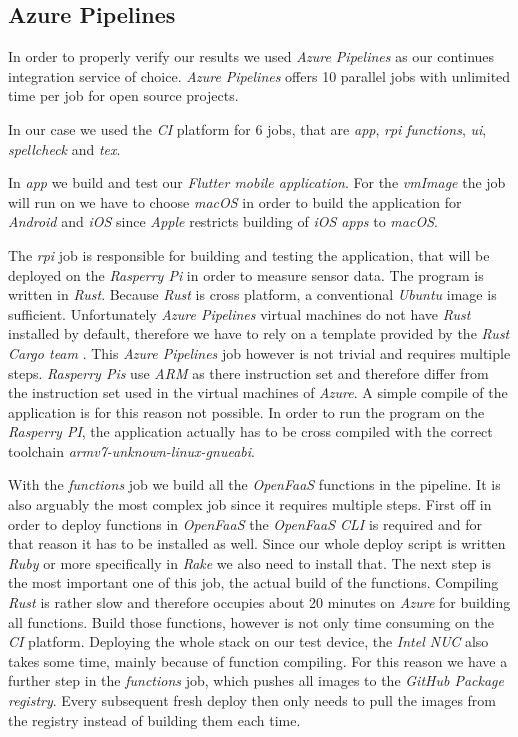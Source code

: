 \subsection{Azure Pipelines}

In order to properly verify our results we used \textit{Azure Pipelines} as our continues
integration service of choice. \textit{Azure Pipelines} offers 10 parallel jobs with unlimited time
per job for open source projects. \cite{azure-pipelines-devop}

In our case we used the \textit{CI} platform for 6 jobs, that are \textit{app}, \textit{rpi}
\textit{functions}, \textit{ui}, \textit{spellcheck} and \textit{tex}.

In \textit{app} we build and test our \textit{Flutter mobile application}. For the \textit{vmImage}
the job will run on we have to choose \textit{macOS} in order to build the application for
\textit{Android} and \textit{iOS} since \textit{Apple} restricts building of \textit{iOS apps} to
\textit{macOS}.

The \textit{rpi} job is responsible for building and testing the application, that will be deployed
on the \textit{Rasperry Pi} in order to measure sensor data. The program is written in
\textit{Rust}. Because \textit{Rust} is cross platform, a conventional \textit{Ubuntu} image is
sufficient. Unfortunately \textit{Azure Pipelines} virtual machines do not have \textit{Rust}
installed by default, therefore we have to rely on a template provided by the \textit{Rust Cargo
team} \cite{rust-cargo}. This \textit{Azure Pipelines} job however is not trivial and requires
multiple steps. \textit{Rasperry Pis} use \textit{ARM} as there instruction set and therefore differ
from the instruction set used in the virtual machines of \textit{Azure}. A simple compile of the
application is for this reason not possible. In order to run the program on the \textit{Rasperry
PI}, the application actually has to be cross compiled with the correct toolchain
\textit{armv7-unknown-linux-gnueabi}.

With the \textit{functions} job we build all the \textit{OpenFaaS} functions in the pipeline. It is
also arguably the most complex job since it requires multiple steps. First off in order to deploy
functions in \textit{OpenFaaS} the \textit{OpenFaaS CLI} is required and for that reason it has to
be installed as well. Since our whole deploy script is written \textit{Ruby} or more specifically in
\textit{Rake} we also need to install that. The next step is the most important one of this job, the
actual build of the functions. Compiling \textit{Rust} is rather slow and therefore occupies about
20 minutes on \textit{Azure} for building all functions. Build those functions, however is not only
time consuming on the \textit{CI} platform. Deploying the whole stack on our test device, the
\textit{Intel NUC} also takes some time, mainly because of function compiling. For this reason we
have a further step in the \textit{functions} job, which pushes all images to the \textit{GitHub
Package registry}. Every subsequent fresh deploy then only needs to pull the images from the
registry instead of building them each time.

